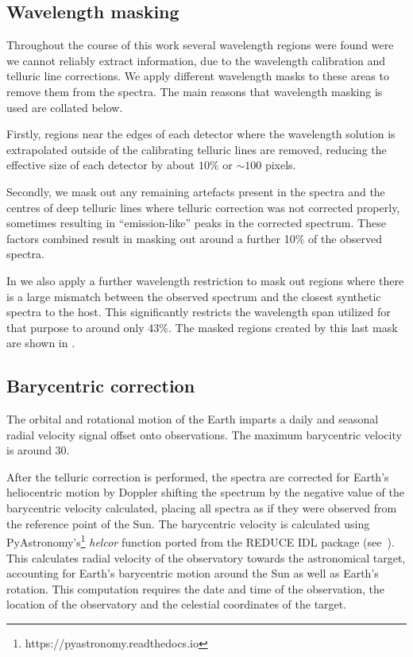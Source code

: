\subsection{Wavelength masking}
Throughout the course of this work several wavelength regions were found were we cannot reliably extract information, due to the wavelength calibration and telluric line corrections.
We apply different wavelength masks to these areas to remove them from the spectra. The main reasons that wavelength masking is used are collated below. 

Firstly, regions near the edges of each detector where the wavelength solution is extrapolated outside of the calibrating telluric lines are removed, reducing the effective size of each detector by about \(10\%\) or \(\sim100\) pixels.

Secondly, we mask out any remaining artefacts present in the spectra and the centres of deep telluric lines where telluric correction was not corrected properly, sometimes resulting in ``emission-like'' peaks in the corrected spectrum. These factors combined result in masking out around a further 10\% of the observed spectra.

In  we also apply a further wavelength restriction to mask out regions where there is a large mismatch between the observed spectrum and the closest synthetic spectra to the host. This significantly restricts the wavelength span utilized for that purpose to around only 43\%. The masked regions created by this last mask are shown in .




\subsection{Barycentric correction}
The orbital and rotational motion of the Earth imparts a daily and seasonal radial velocity signal offset onto observations. The maximum barycentric velocity is around 30\kmps{}.

After the telluric correction is performed, the spectra are corrected for Earth's heliocentric motion by Doppler shifting the spectrum by the negative value of the barycentric velocity calculated, placing all spectra as if they were observed from the reference point of the Sun. The barycentric velocity is calculated using PyAstronomy's\footnote{https://pyastronomy.readthedocs.io} \emph{helcor} function ported from the REDUCE IDL package (see~\citet[][]{piskunov_new_2002}). This calculates radial velocity of the observatory towards the astronomical target, accounting for Earth's barycentric motion around the Sun as well as Earth's rotation. This computation requires the date and time of the observation, the location of the observatory and the celestial coordinates of the target.
